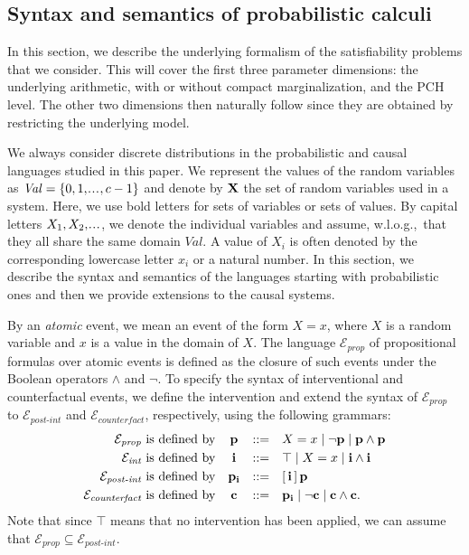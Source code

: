 \documentclass[a4paper,UKenglish,cleveref, autoref, thm-restate]{lipics-v2021}
\newcommand{\maxvaluecount}{c}
\newcommand{\cE}{{\mathcal E}}
\newcommand{\bX}{{\bf X}}
\newcommand{\bc}{{\bf c}}
\newcommand{\bi}{{\bf i}}
\newcommand{\bp}{{\bf p}}
\def\Eprop{\cE_{\textit{prop}}}
\def\Eint{\cE_{\textit{int}}}
\def\Epint{\cE_{\textit{post-int}}}
\def\Ecounter{\cE_{\textit{counterfact}}}
\newcommand\myldots{\!\makebox[1em][c]{.\hfil.\hfil.}}
\begin{document}
\subsection{Syntax and semantics of probabilistic calculi}
\label{sec:appendix:formal:definitions:syntax:and:semantics}

In this section, we describe the underlying formalism of the satisfiability problems that we consider. This will cover the first three parameter dimensions: the underlying arithmetic, with or without compact marginalization, and the PCH level. The other two dimensions then naturally follow since they are obtained by restricting the underlying model.

We always consider discrete distributions 
in the probabilistic and causal languages studied in this paper. We
represent the values  of the random variables as $\mathit{Val} = \{0,1,\myldots, \maxvaluecount - 1\}$ 
and denote by $\bX$ the set of random variables used in a system. 
Here, we use bold letters for sets of variables or sets of values.
By capital letters $X_1,X_2, \myldots$, we denote the individual variables 
and assume, w.l.o.g.,~that they all share the same domain  $\mathit{Val}$.
A value of $X_i$ is often denoted by the corresponding lowercase letter $x_i$ or a natural number.
In this section, we describe the syntax and semantics of the languages starting 
with probabilistic ones and then we provide extensions to the causal systems.


By an \emph{atomic} event, we mean an event of the form $X=x$, where 
$X$ is a random variable and $x$ is a value in the domain of $X$. 
The language $\Eprop$ of propositional formulas over atomic events is defined 
as the closure of such events under the Boolean operators $\wedge$ and $\neg$. 
To specify the syntax of interventional and counterfactual events, we 
define the intervention and extend the syntax of $\Eprop$ to $\Epint$ and $\Ecounter$,
respectively,
using the following grammars:
\[
\begin{array}{rccl}
 \mbox{$\Eprop$ is defined by} 	& \bp 	& ::= & X = x  \mid \neg \bp \mid \bp \wedge \bp
 	 \\[1mm]
\mbox{$\Eint$ is defined by}    	& \bi		& ::= & \top \mid  X = x       \mid  \bi \wedge \bi 
	 \\[1mm]
\mbox{$\Epint$ is defined by} 	&\bp_{\bi} 	& ::= & [\, \bi\, ]\, \bp \\[1mm]
  \mbox{$\Ecounter$ is defined by}	& \bc 	& ::= & \bp_{\bi}  \mid \neg \bc \mid \bc \wedge \bc.
\end{array}
\]
Note that since $\top$ means that no intervention has been applied,
we can assume that $\Eprop \subseteq \Epint$.
 
\end{document}
